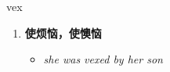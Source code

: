 
\begin{frame}
{\huge vex}
\begin{center}
\begin{enumerate}\Large
  \item \textbf{使烦恼，使懊恼}
  \begin{itemize}
    \item \em{\Large{she was vexed by her son}}
  \end{itemize}
\end{enumerate}
\end{center}
\end{frame}
